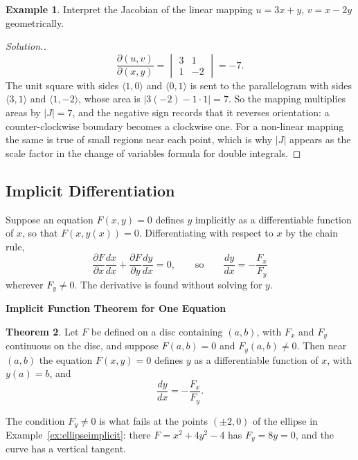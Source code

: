 \documentclass[11pt,a4paper]{article}
\theoremstyle{definition}
\newtheorem{thm}{Theorem}[subsection]
\newtheorem{exa}[thm]{Example}
\newenvironment{solution}
  {\renewcommand{\qedsymbol}{}\begin{proof}[\textit{Solution}.]}
  {\end{proof}}
\newcommand{\subhead}[1]{%
  \par\medskip\noindent\textbf{#1}\par\nobreak\smallskip}
\begin{document}
\begin{exa}
\label{ex:jacarea}
Interpret the Jacobian of the linear mapping $u = 3x + y$, $v = x - 2y$
geometrically.
\end{exa}

\begin{solution}
\[\frac{\partial(u,v)}{\partial(x,y)} = \begin{vmatrix}3 & 1\\ 1 &
-2\end{vmatrix} = -7 .\]
The unit square with sides $\langle 1,0\rangle$ and $\langle 0,1\rangle$ is
sent to the parallelogram with sides $\langle 3,1\rangle$ and $\langle
1,-2\rangle$, whose area is $|3(-2) - 1\cdot 1| = 7$. So the mapping multiplies
areas by $|J| = 7$, and the negative sign records that it reverses orientation:
a counter-clockwise boundary becomes a clockwise one. For a non-linear mapping
the same is true of small regions near each point, which is why $|J|$ appears
as the scale factor in the change of variables formula for double integrals.
\end{solution}

{\color[wave]{485}\subsection{Implicit Differentiation}}

Suppose an equation $F(x,y) =0$ defines $y$ implicitly as a differentiable
function of $x$, so that $F(x,y(x)) = 0$. Differentiating with respect to $x$ by
the chain rule,
\[\frac{\partial F}{\partial x}\frac{dx}{dx} +\frac{\partial F}{\partial y}
\frac{dy}{dx} = 0,\qquad\text{so}\qquad \frac{dy}{dx}=-\frac{F_x}{F_y}\]
wherever $F_y\neq 0$. The derivative is found without solving for $y$.

\subhead{Implicit Function Theorem for One Equation}

\begin{thm}
\label{thm:ift1}
Let $F$ be defined on a disc containing $(a,b)$, with $F_x$ and $F_y$ continuous
on the disc, and suppose $F(a,b) =0$ and $F_y(a,b) \neq 0$. Then near $(a,b)$ the
equation $F(x,y) = 0$ defines $y$ as a differentiable function of $x$, with
$y(a) = b$, and
\[\frac{dy}{dx}=-\frac{F_x}{F_y} .\]
\end{thm}

The condition $F_y\neq 0$ is what fails at the points $(\pm 2,0)$ of the ellipse
in Example~\ref{ex:ellipseimplicit}: there $F = x^2 + 4y^2 - 4$ has
$F_y = 8y = 0$, and the curve has a vertical tangent.
\end{document}
